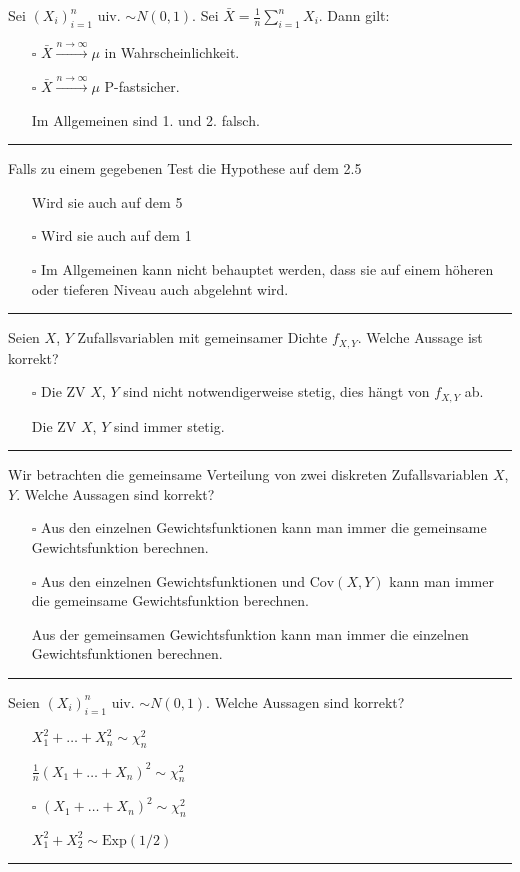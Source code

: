 \begin{tiny}
Sei $(X_i)_{i=1}^n$ uiv. $\sim N(0, 1)$. Sei $\bar{X} = \frac{1}{n} \sum_{i=1}^{n} X_i$. Dann gilt:
\begin{itemize}
    \item[$\square$] $\bar{X} \overset{n \to \infty}{\longrightarrow} \mu$ in Wahrscheinlichkeit.
    \item[$\square$] $\bar{X} \overset{n \to \infty}{\longrightarrow} \mu$ P-fastsicher.
    \item[\checkmark] Im Allgemeinen sind 1. und 2. falsch.
\end{itemize}
\rule{\linewidth}{0.4pt}

Falls zu einem gegebenen Test die Hypothese auf dem 2.5%
\begin{itemize}
    \item[\checkmark] Wird sie auch auf dem 5%
    \item[$\square$] Wird sie auch auf dem 1%
    \item[$\square$] Im Allgemeinen kann nicht behauptet werden, dass sie auf einem höheren oder tieferen Niveau auch abgelehnt wird.
\end{itemize}
\rule{\linewidth}{0.4pt}

Seien $X$, $Y$ Zufallsvariablen mit gemeinsamer Dichte $f_{X,Y}$. Welche Aussage ist korrekt?
\begin{itemize}
    \item[$\square$] Die ZV $X$, $Y$ sind nicht notwendigerweise stetig, dies hängt von $f_{X,Y}$ ab.
    \item[\checkmark] Die ZV $X$, $Y$ sind immer stetig.
\end{itemize}
\rule{\linewidth}{0.4pt}

Wir betrachten die gemeinsame Verteilung von zwei diskreten Zufallsvariablen $X$, $Y$. Welche Aussagen sind korrekt?
\begin{itemize}
    \item[$\square$] Aus den einzelnen Gewichtsfunktionen kann man immer die gemeinsame Gewichtsfunktion berechnen.
    \item[$\square$] Aus den einzelnen Gewichtsfunktionen und $\text{Cov}(X, Y)$ kann man immer die gemeinsame Gewichtsfunktion berechnen.
    \item[\checkmark] Aus der gemeinsamen Gewichtsfunktion kann man immer die einzelnen Gewichtsfunktionen berechnen.
\end{itemize}
\rule{\linewidth}{0.4pt}

Seien $(X_i)_{i=1}^n$ uiv. $\sim N(0, 1)$. Welche Aussagen sind korrekt?
\begin{itemize}
    \item[\checkmark] $X_1^2 + \dots + X_n^2 \sim \chi^2_n$
    \item[\checkmark] $\frac{1}{n}(X_1 + \dots + X_n)^2 \sim \chi^2_n$
    \item[$\square$] $(X_1 + \dots + X_n)^2 \sim \chi^2_n$
    \item[\checkmark] $X_1^2 + X_2^2 \sim \text{Exp}(1/2)$
\end{itemize}
\rule{\linewidth}{0.4pt}


\end{tiny}

